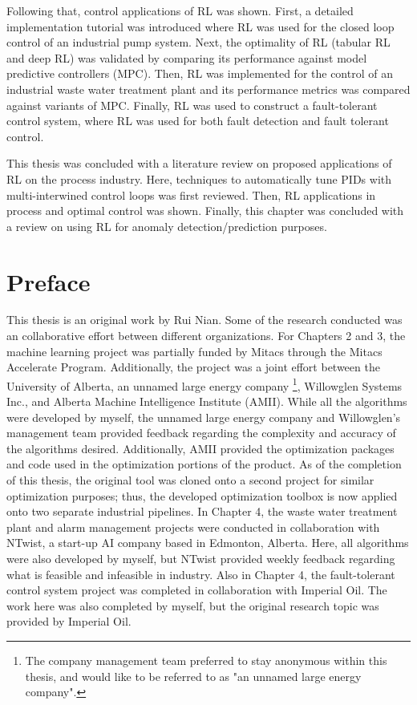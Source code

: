 \documentclass[12pt]{report}
\begin{document}
Following that, control applications of RL was shown.  First, a detailed implementation tutorial was introduced where RL was used for the closed loop control of an industrial pump system. Next, the optimality of RL (tabular RL and deep RL) was validated by comparing its performance against model predictive controllers (MPC). Then, RL was implemented for the control of an industrial waste water treatment plant and its performance metrics was compared against variants of MPC. Finally, RL was used to construct a fault-tolerant control system, where RL was used for both fault detection and fault tolerant control.

This thesis was concluded with a literature review on proposed applications of RL on the process industry.  Here, techniques to automatically tune PIDs with multi-interwined control loops was first reviewed. Then, RL applications in process and optimal control was shown.  Finally, this chapter was concluded with a review on using RL for anomaly detection/prediction purposes.




\chapter*{Preface}
This thesis is an original work by Rui Nian. Some of the research conducted was an collaborative effort between different organizations.  For Chapters 2 and 3, the machine learning project was partially funded by Mitacs through the Mitacs Accelerate Program.  Additionally, the project was a joint effort between the University of Alberta, an unnamed large energy company \footnote{The company management team preferred to stay anonymous within this thesis, and would like to be referred to as "an unnamed large energy company".}, Willowglen Systems Inc., and Alberta Machine Intelligence Institute (AMII). While all the algorithms were developed by myself, the unnamed large energy company and Willowglen's management team provided feedback regarding the complexity and accuracy of the algorithms desired. Additionally, AMII provided the optimization packages and code used in the optimization portions of the product. As of the completion of this thesis, the original tool was cloned onto a second project for similar optimization purposes; thus, the developed optimization toolbox is now applied onto two separate industrial pipelines. In Chapter 4, the waste water treatment plant and alarm management projects were conducted in collaboration with NTwist, a start-up AI company based in Edmonton, Alberta. Here, all algorithms were also developed by myself, but NTwist provided weekly feedback regarding what is feasible and infeasible in industry. Also in Chapter 4, the fault-tolerant control system project was completed in collaboration with Imperial Oil. The work here was also completed by myself, but the original research topic was provided by Imperial Oil. 
\end{document}
